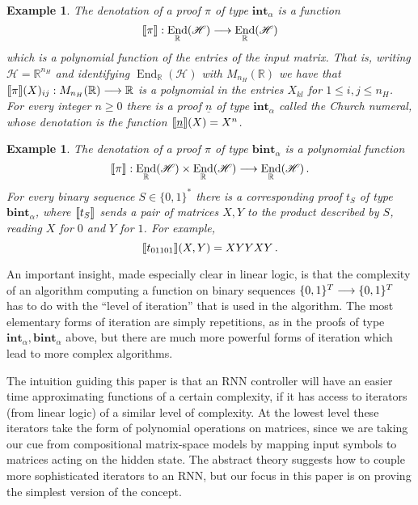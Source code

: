 \documentclass[english,letter paper,12pt,leqno]{article}
\theoremstyle{example}
\newtheorem{example}[theorem]{Example}
\numberwithin{equation}{section}
\DeclareMathOperator{\End}{End}
\begin{document}
\begin{example}\label{example_1} The \emph{denotation} of a proof $\pi$ of type $\textbf{int}_\alpha$ is a function
\[
\den{\pi}: \End_{\mathbb{R}}(\mathscr{H}) \lto \End_{\mathbb{R}}(\mathscr{H})
\]
which is a polynomial function of the entries of the input matrix. That is, writing $\mathscr{H} = \mathbb{R}^{n_H}$ and identifying $\End_{\mathbb{R}}(\mathscr{H})$ with $M_{n_H}(\mathbb{R})$ we have that $\llbracket \pi \rrbracket(X)_{ij}: M_{n_H}(\mathbb{R}) \longrightarrow \mathbb{R}$ is a polynomial in the entries $X_{kl}$ for $1 \le i, j \le n_H$. For every integer $n \ge 0$ there is a proof $\underline{n}$ of type $\textbf{int}_\alpha$ called the \emph{Church numeral}, whose denotation is the function $\llbracket \underline{n} \rrbracket(X) = X^n$.
\end{example}

\begin{example}\label{example_2} The denotation of a proof $\pi$ of type $\textbf{bint}_\alpha$ is a polynomial function
\[
\den{\pi}: \End_{\mathbb{R}}(\mathscr{H}) \times \End_{\mathbb{R}}(\mathscr{H}) \lto \End_{\mathbb{R}}(\mathscr{H})\,.
\]
For every binary sequence $S \in \{0,1\}^*$ there is a corresponding proof $t_S$ of type $\textbf{bint}_\alpha$, where $\llbracket t_S \rrbracket$ sends a pair of matrices $X,Y$ to the product described by $S$, reading $X$ for $0$ and $Y$ for $1$. For example,
\[
\llbracket t_{01101} \rrbracket(X,Y) = X Y Y X Y\,.
\]
\end{example}

An important insight, made especially clear in linear logic, is that the complexity of an algorithm computing a function on binary sequences $\{0,1\}^T \longrightarrow \{0,1\}^T$ has to do with the ``level of iteration'' that is used in the algorithm. The most elementary forms of iteration are simply repetitions, as in the proofs of type $\textbf{int}_\alpha, \textbf{bint}_\alpha$ above, but there are much more powerful forms of iteration which lead to more complex algorithms.

The intuition guiding this paper is that an RNN controller will have an easier time approximating functions of a certain complexity, if it has access to iterators (from linear logic) of a similar level of complexity. At the lowest level these iterators take the form of polynomial operations on matrices, since we are taking our cue from compositional matrix-space models by mapping input symbols to matrices acting on the hidden state. The abstract theory suggests how to couple more sophisticated iterators to an RNN, but our focus in this paper is on proving the simplest version of the concept.
\\
\end{document}
